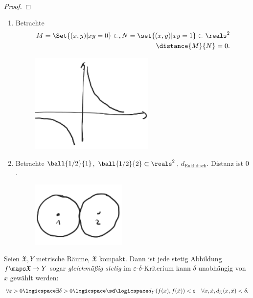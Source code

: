 \begin{beispiel*}
\begin{proof}
    \end{proof}
    \begin{achtung*}
        \begin{enumerate}
            \item Betrachte
            \begin{align*}
                M=\Set{(x,y)|xy=0}\subset , N=\set{(x,y)|xy=1}\subset \reals^2\\
                \distance{M}{N}=0.
            \end{align*}
            \begin{figure}[H]
                \centering
                \includegraphics[width=0.3\linewidth]{figures/achsen_und_eins_durch_x}
                \label{fig:achsen_und_eins_durch_x}
            \end{figure}
            
            \item Betrachte \( \ball{1/2}{1} \), \( \ball{1/2}{2}\subset \reals^2 \), \( d_{\text{Euklidisch}} \). Distanz ist \( 0 \).
            \begin{figure}[H]
                \centering
                \includegraphics[width=0.3\linewidth]{figures/beruehrende_kreise}
                \label{fig:beruehrende_kreise}
            \end{figure}
            
        \end{enumerate}
    \end{achtung*}    
\end{beispiel*}
\begin{satzdef}
    Seien \( \mathfrak{X},Y \) metrische Räume, \( \mathfrak{X} \) kompakt. Dann ist jede stetig Abbildung \( f\maps \mathfrak{X}\to Y \) sogar \emph{gleichmäßig stetig} \dh im \( \varepsilon \)-\( \delta \)-Kriterium kann \( \delta \) unabhängig von \( x \) gewählt werden:
    \begin{align*}
        \forall \varepsilon>0\logicspace \exists \delta>0\logicspace\text{\sd}\logicspace d_Y(f(x),f(\tilde{x}))<\varepsilon\quad \forall x,\tilde{x},d_{\mathfrak{X}}(x,\tilde{x})<\delta.
    \end{align*}
\end{satzdef}

